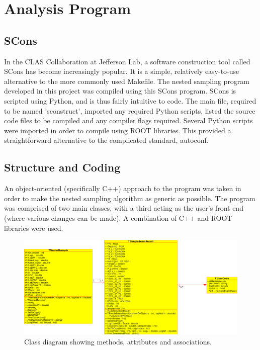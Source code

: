 \documentclass[a4paper,12pt]{article}
\begin{document}

\section{Analysis Program}
\subsection{SCons}
In the CLAS Collaboration at Jefferson Lab, a software construction tool called SCons\cite{scons} has become increasingly popular.  It is a simple, relatively easy-to-use alternative to the more commonly used Makefile.  The nested sampling program developed in this project was compiled using this SCons program.  SCons is scripted using Python, and is thus fairly intuitive to code.  The main file, required to be named 'sconstruct', imported any required Python scripts, listed the source code files to be compiled and any compiler flags required. Several Python scripts were imported in order to compile using ROOT libraries.  This provided a straightforward alternative to the complicated standard, autoconf.


 
\subsection{Structure and Coding}
An object-oriented (specifically C++) approach to the program was taken in order to make the nested sampling algorithm as generic as possible.  The program was comprised of two main classes, with a third acting as the user's front end (where various changes can be made). A combination of C++ and ROOT libraries were used.  
\newline

\begin{figure}[!h]
 \begin{center}
  \includegraphics[scale=0.5]{class_diagram.eps}
  \caption{Class diagram showing methods, attributes and associations.}
 \end{center}
\end{figure}
\end{document}
